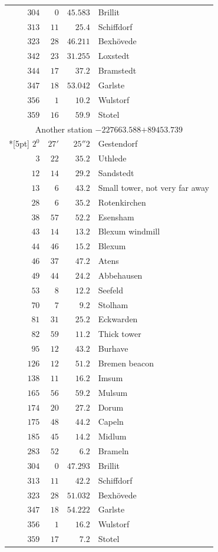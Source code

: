 \begin{longtable}{@{}rrrp{.61\linewidth}@{}}
\(304\)&\(0\)&\(45.583\)&\raggedright Brillit\tabularnewline
\(313\)&\(11\)&\(25.4\)&\raggedright Schiffdorf\tabularnewline
\(323\)&\(28\)&\(46.211\)&\raggedright Bexhövede\tabularnewline
\(342\)&\(23\)&\(31.255\)&\raggedright Loxstedt\tabularnewline
\(344\)&\(17\)&\(37.2\)&\raggedright Bramstedt\tabularnewline
\(347\)&\(18\)&\(53.042\)&\raggedright Garlste\tabularnewline
\(356\)&\(1\)&\(10.2\)&\raggedright Wulstorf\tabularnewline
\(359\)&\(16\)&\(59.9\)&\raggedright Stotel\tabularnewline
\multicolumn{4}{c}{Another station \(-227663.588\)\qquad\(+89453.739\)}\\*[5pt]
\(2^{0}\)&\(27'\)&\(25''2\)&\raggedright Gestendorf\tabularnewline
\(3\)&\(22\)&\(35.2\)&\raggedright Uthlede\tabularnewline
\(12\)&\(14\)&\(29.2\)&\raggedright Sandstedt\tabularnewline
\(13\)&\(6\)&\(43.2\)&\raggedright Small tower, not very far away\tabularnewline
\(28\)&\(6\)&\(35.2\)&\raggedright Rotenkirchen\tabularnewline
\(38\)&\(57\)&\(52.2\)&\raggedright Esensham\tabularnewline
\(43\)&\(14\)&\(13.2\)&\raggedright Blexum windmill\tabularnewline
\(44\)&\(46\)&\(15.2\)&\raggedright Blexum\tabularnewline
\(46\)&\(37\)&\(47.2\)&\raggedright Atens\tabularnewline
\(49\)&\(44\)&\(24.2\)&\raggedright Abbehausen\tabularnewline
\(53\)&\(8\)&\(12.2\)&\raggedright Seefeld\tabularnewline
\(70\)&\(7\)&\(9.2\)&\raggedright Stolham\tabularnewline
\(81\)&\(31\)&\(25.2\)&\raggedright Eckwarden\tabularnewline
\(82\)&\(59\)&\(11.2\)&\raggedright Thick tower\tabularnewline
\(95\)&\(12\)&\(43.2\)&\raggedright Burhave\tabularnewline
\(126\)&\(12\)&\(51.2\)&\raggedright Bremen beacon\tabularnewline
\(138\)&\(11\)&\(16.2\)&\raggedright Imsum\tabularnewline
\(165\)&\(56\)&\(59.2\)&\raggedright Mulsum\tabularnewline
\(174\)&\(20\)&\(27.2\)&\raggedright Dorum\tabularnewline
\(175\)&\(48\)&\(44.2\)&\raggedright Capeln\tabularnewline
\(185\)&\(45\)&\(14.2\)&\raggedright Midlum\tabularnewline
\(283\)&\(52\)&\(6.2\)&\raggedright Brameln\tabularnewline
\(304\)&\(0\)&\(47.293\)&\raggedright Brillit\tabularnewline
\(313\)&\(11\)&\(42.2\)&\raggedright Schiffdorf\tabularnewline
\(323\)&\(28\)&\(51.032\)&\raggedright Bexhövede\tabularnewline
\(347\)&\(18\)&\(54.222\)&\raggedright Garlste\tabularnewline
\(356\)&\(1\)&\(16.2\)&\raggedright Wulstorf\tabularnewline
\(359\)&\(17\)&\(7.2\)&\raggedright Stotel\tabularnewline
\end{longtable}
\endgroup
